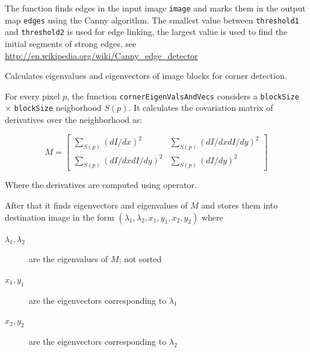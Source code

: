 The function finds edges in the input image \texttt{image} and marks them in the output map \texttt{edges} using the Canny algorithm. The smallest value between \texttt{threshold1} and \texttt{threshold2} is used for edge linking, the largest value is used to find the initial segments of strong edges, see
\url{http://en.wikipedia.org/wiki/Canny_edge_detector}

Calculates eigenvalues and eigenvectors of image blocks for corner detection.

\begin{description}
\end{description}

For every pixel $p$, the function \texttt{cornerEigenValsAndVecs} considers a \texttt{blockSize} $\times$ \texttt{blockSize} neigborhood $S(p)$. It calculates the covariation matrix of derivatives over the neighborhood as:

\[
M = \begin{bmatrix}
\sum_{S(p)}(dI/dx)^2 & \sum_{S(p)}(dI/dx dI/dy)^2 \\
\sum_{S(p)}(dI/dx dI/dy)^2 & \sum_{S(p)}(dI/dy)^2
\end{bmatrix}
\]

Where the derivatives are computed using  operator.

After that it finds eigenvectors and eigenvalues of $M$ and stores them into destination image in the form
$(\lambda_1, \lambda_2, x_1, y_1, x_2, y_2)$ where
\begin{description}
\item[$\lambda_1, \lambda_2$]are the eigenvalues of $M$; not sorted
\item[$x_1, y_1$]are the eigenvectors corresponding to $\lambda_1$
\item[$x_2, y_2$]are the eigenvectors corresponding to $\lambda_2$
\end{description}

